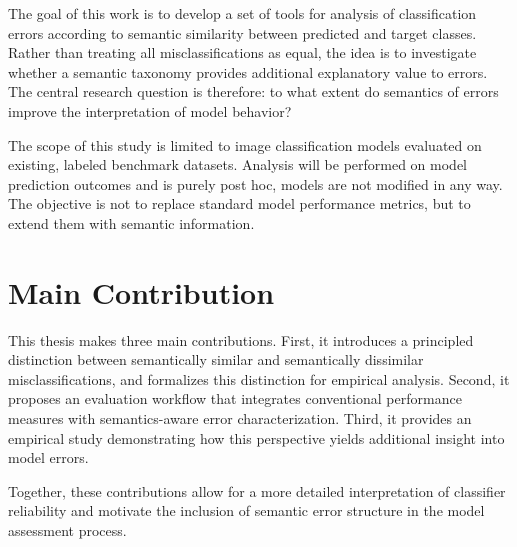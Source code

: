 The goal of this work is to develop a set of tools for analysis of classification errors according to semantic similarity between predicted and target classes.
Rather than treating all misclassifications as equal, the idea is to investigate whether a semantic taxonomy provides additional explanatory value to errors.
The central research question is therefore: to what extent do semantics of errors improve the interpretation of model behavior?

The scope of this study is limited to image classification models evaluated on existing, labeled benchmark datasets.
Analysis will be performed on model prediction outcomes and is purely post hoc, models are not modified in any way.
The objective is not to replace standard model performance metrics, but to extend them with semantic information.

\section{Main Contribution}

This thesis makes three main contributions.
First, it introduces a principled distinction between semantically similar and semantically dissimilar misclassifications, and formalizes this distinction for empirical analysis.
Second, it proposes an evaluation workflow that integrates conventional performance measures with semantics-aware error characterization.
Third, it provides an empirical study demonstrating how this perspective yields additional insight into model errors.

Together, these contributions allow for a more detailed interpretation of classifier reliability and motivate the inclusion of semantic error structure in the model assessment process.
